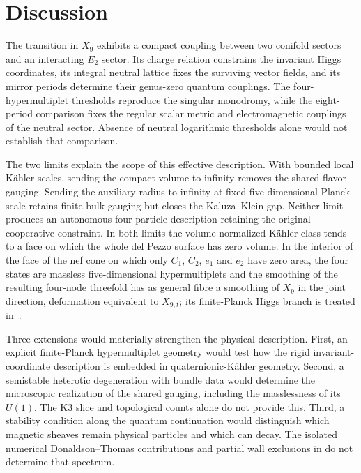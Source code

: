 \section{Discussion}
\label{sec:discussion}

The transition in $X_9$ exhibits a compact coupling between
two conifold sectors and an interacting $E_2$ sector. Its
charge relation constrains the invariant Higgs coordinates,
its integral neutral lattice fixes the surviving vector
fields, and its mirror periods determine their genus-zero
quantum couplings. The four-hypermultiplet thresholds reproduce the
singular monodromy, while the eight-period comparison fixes the
regular scalar metric and electromagnetic couplings of the neutral
sector. Absence of neutral logarithmic thresholds alone would not
establish that comparison.

The two limits explain the scope of this effective description.
With bounded local K\"ahler scales, sending the compact volume to
infinity removes the shared flavor gauging. Sending the auxiliary
radius to infinity at fixed five-dimensional Planck scale retains
finite bulk gauging but closes the Kaluza--Klein gap. Neither limit
produces an autonomous four-particle description retaining the
original cooperative constraint. In both limits the volume-normalized
K\"ahler class tends to a face on which the whole del Pezzo surface has
zero volume. In the interior of the face of the nef cone on which only
$C_1$, $C_2$, $e_1$ and $e_2$ have zero area, the four states are
massless five-dimensional hypermultiplets and the smoothing of the
resulting four-node threefold has as general fibre a smoothing of $X_9$
in the joint direction, deformation equivalent to $X_{9,t}$; its
finite-Planck Higgs branch is treated in~\cite{Wuebben:2026finiteplanck}.

Three extensions would materially strengthen the physical
description. First, an explicit finite-Planck hypermultiplet
geometry would test how the rigid invariant-coordinate
description is embedded in quaternionic-K\"ahler geometry.
Second, a semistable heterotic degeneration with bundle data
would determine the microscopic realization of the shared
gauging, including the masslessness of its $U(1)$. The K3
slice and topological counts alone do not provide this.
Third, a stability condition along the quantum continuation
would distinguish which magnetic sheaves remain physical
particles and which can decay. The isolated numerical
Donaldson--Thomas contributions and partial wall exclusions
in \cite{Wuebben:2026magnetic} do not determine that spectrum.

